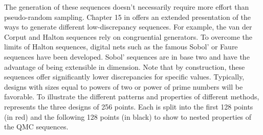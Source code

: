
The generation of these sequences doesn't necessarily require more effort than pseudo-random sampling.
Chapter 15 in \citet{owen_2013} offers an extended presentation of the ways to generate different low-discrepancy sequences. 
For example, the van der Corput and Halton sequences rely on congruential generators. 
To overcome the limits of Halton sequences, digital nets such as the famous Sobol' or Faure sequences have been developed.  
Sobol' sequences are in base two and have the advantage of being extensible in dimension. 
Note that by construction, these sequences offer significantly lower discrepancies for specific values. 
Typically, designs with sizes equal to powers of two or power of prime numbers will be favorable. 
To illustrate the different patterns and properties of different methods,  represents the three designs of 256 points. 
Each is split into the first 128 points (in red) and the following 128 points (in black) to show to nested properties of the QMC sequences.

